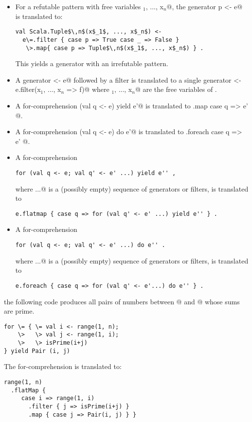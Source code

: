 \documentclass[11pt]{report}
\begin{document}
\begin{itemize}
\item
For a refutable pattern \verb@p@ with free variables
\verb@x$_1$, ..., x$_n$@, 
the generator \verb@val p <- e@ is translated to:
\begin{verbatim}
val Scala.Tuple$\,n$(x$_1$, ..., x$_n$) <- 
  e\=.filter { case p => True case _ => False }
   \>.map{ case p => Tuple$\,n$(x$_1$, ..., x$_n$) } .
\end{verbatim}
This yields a generator with an irrefutable pattern.

\item
A generator \verb@q <- e@ followed by a filter \verb@f@ is translated to
a single generator \verb@q <- e.filter(x$_1$, ..., x$_n$ => f)@ where
\verb@x$_1$, ..., x$_n$@ are the free variables of \verb@q@.

\item
A for-comprehension 
\verb@for (val q <- e) yield e'@
is translated to
\verb@e.map { case q => e' }@.

\item
A for-comprehension
\verb@for (val q <- e) do e'@
is translated to
\verb@e.foreach { case q => e' }@.

\item
A for-comprehension
\begin{verbatim}
for (val q <- e; val q' <- e' ...) yield e'' ,
\end{verbatim}
where \verb@...@ is a (possibly empty)
sequence of generators or filters,
is translated to
\begin{verbatim}
e.flatmap { case q => for (val q' <- e' ...) yield e'' } .
\end{verbatim}
\item
A for-comprehension
\begin{verbatim}
for (val q <- e; val q' <- e' ...) do e'' .
\end{verbatim}
where \verb@...@ is a (possibly empty)
sequence of generators or filters,
is translated to
\begin{verbatim}
e.foreach { case q => for (val q' <- e'...) do e'' } .
\end{verbatim}
\end{itemize}

\example
the following code produces all pairs of numbers
between @ and @ whose sums are prime.
\begin{verbatim}
for \= { \= val i <- range(1, n);
    \>   \> val j <- range(1, i);
    \>   \> isPrime(i+j)
} yield Pair (i, j)
\end{verbatim}
The for-comprehension is translated to:
\begin{verbatim}
range(1, n)
  .flatMap {
     case i => range(1, i)
       .filter { j => isPrime(i+j) }
       .map { case j => Pair(i, j) } }
\end{verbatim}
\end{document}
